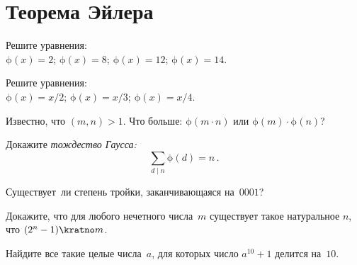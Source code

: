 
\section*{Теорема Эйлера}


\begingroup
    \ifx\mathup\undefined
        \def\eulerphi{\upphi}
    \else
        \def\eulerphi{\mathup{\phi}}
    \fi
    \providecommand\divides{\mathrel{\vert}}

\begin{problems}

\item
Решите уравнения:
\\
\subproblem $\eulerphi(x) = 2$;
\qquad
\subproblem $\eulerphi(x) = 8$;
\qquad
\subproblem $\eulerphi(x) = 12$;
\qquad
\subproblem $\eulerphi(x) = 14$.

\item
Решите уравнения:
\\
\subproblem $\eulerphi(x) = x / 2$;
\qquad
\subproblem $\eulerphi(x) = x / 3$;
\qquad
\subproblem $\eulerphi(x) = x / 4$.

\item
Известно, что $(m, n) > 1$.
Что больше: $\eulerphi(m \cdot n)$ или $\eulerphi(m) \cdot \eulerphi(n)$?

\item
Докажите \emph{тождество Гаусса:}
\[
    \sum_{d \divides n}
        \eulerphi(d)
=
    n
\, . \]

\item
Существует~ли степень тройки, заканчивающаяся на~$0001$?

\item
Докажите, что для любого нечетного числа~$m$ существует такое натуральное
$n$, что $(2^n - 1) \kratno m$.

\item
Найдите все такие целые числа~$a$, для которых число $a^{10} + 1$ делится
на~$10$.

\end{problems}

\endgroup %

